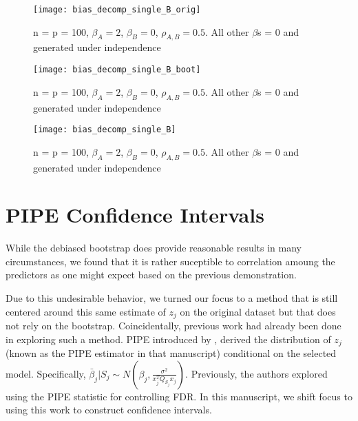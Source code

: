 
\begin{figure}[hbtp]
    \begin{center}
    \texttt{[image: bias\_decomp\_single\_B\_orig]}
    \caption{\label{Fig:bias_decomp_single_B_orig} n = p = 100, $\beta_A = 2$, $\beta_B = 0$, $\rho_{A,B} = 0.5$.  All other $\beta$s = 0 and  generated under independence}
    \end{center}
\end{figure}

\begin{figure}[hbtp]
    \begin{center}
    \texttt{[image: bias\_decomp\_single\_B\_boot]}
    \caption{\label{Fig:bias_decomp_single_B_boot} n = p = 100, $\beta_A = 2$, $\beta_B = 0$, $\rho_{A,B} = 0.5$.  All other $\beta$s = 0 and  generated under independence}
    \end{center}
\end{figure}

\begin{figure}[hbtp]
    \begin{center}
    \texttt{[image: bias\_decomp\_single\_B]}
    \caption{\label{Fig:bias_decomp_single_B} n = p = 100, $\beta_A = 2$, $\beta_B = 0$, $\rho_{A,B} = 0.5$.  All other $\beta$s = 0 and  generated under independence}
    \end{center}
\end{figure}


\section{PIPE Confidence Intervals}

While the debiased bootstrap does provide reasonable results in many circumstances, we found that it is rather suceptible to correlation amoung the predictors as one might expect based on the previous demonstration. 

Due to this undesirable behavior, we turned our focus to a method that is still centered around this same estimate of $z_j$ on the original dataset but that does not rely on the bootstrap. Coincidentally, previous work had already been done in exploring such a method. PIPE introduced by , derived the distribution of $z_j$ (known as the PIPE estimator in that manuscript) conditional on the selected model. Specifically, $\bar{\beta}_j | S_j \sim N(\beta_j, \frac{\sigma^2}{x_j^T Q_{S_j} x_j})$. Previously, the authors explored using the PIPE statistic for controlling FDR. In this manuscript, we shift focus to using this work to construct confidence intervals.

